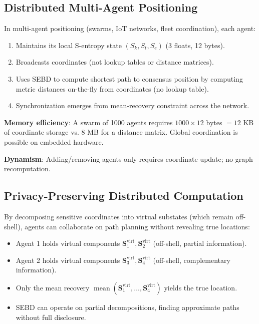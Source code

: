 \documentclass[twocolumn,11pt,a4paper]{article}
\newcommand{\Sk}{S_{k}}
\newcommand{\St}{S_{t}}
\newcommand{\Se}{S_{e}}
\newcommand{\Stuple}{\mathbf{S}}
\DeclareMathOperator{\mean}{mean}
\begin{document}
\subsection{Distributed Multi-Agent Positioning}

In multi-agent positioning (swarms, IoT networks, fleet coordination), each agent:
\begin{enumerate}[nosep]
  \item Maintains its local S-entropy state $(\Sk, \St, \Se)$ (3 floats, 12 bytes).
  \item Broadcasts coordinates (not lookup tables or distance matrices).
  \item Uses SEBD to compute shortest path to consensus position by computing metric distances on-the-fly from coordinates (no lookup table).
  \item Synchronization emerges from mean-recovery constraint across the network.
\end{enumerate}

\textbf{Memory efficiency}: A swarm of 1000 agents requires $1000 \times 12$ bytes $= 12$ KB of coordinate storage vs. 8 MB for a distance matrix. Global coordination is possible on embedded hardware.

\textbf{Dynamism}: Adding/removing agents only requires coordinate update; no graph recomputation.

\subsection{Privacy-Preserving Distributed Computation}

By decomposing sensitive coordinates into virtual substates (which remain off-shell), agents can collaborate on path planning without revealing true locations:
\begin{itemize}[nosep,leftmargin=1em]
  \item Agent 1 holds virtual components $\Stuple_1^{\text{virt}}, \Stuple_2^{\text{virt}}$ (off-shell, partial information).
  \item Agent 2 holds virtual components $\Stuple_3^{\text{virt}}, \Stuple_4^{\text{virt}}$ (off-shell, complementary information).
  \item Only the mean recovery $\mean(\Stuple_1^{\text{virt}}, \ldots, \Stuple_4^{\text{virt}})$ yields the true location.
  \item SEBD can operate on partial decompositions, finding approximate paths without full disclosure.
\end{itemize}
\end{document}
